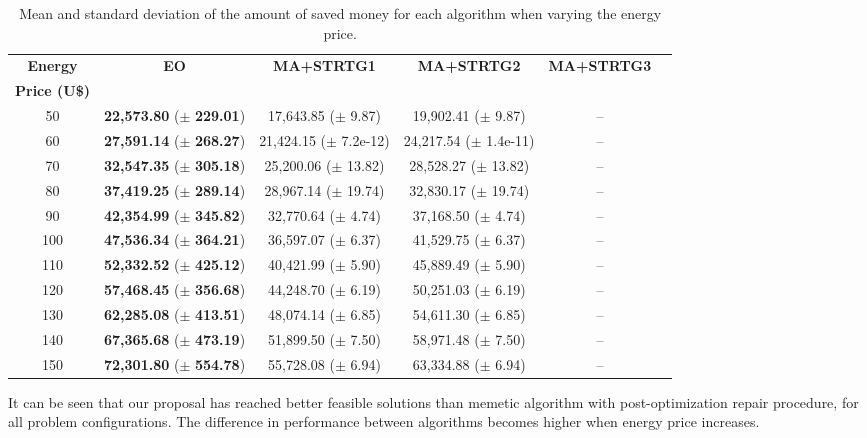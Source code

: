 \documentclass[11pt]{article}
\begin{document}
\begin{table*}[!htb]
\caption{Mean and standard deviation of the amount of saved money for each algorithm 
when varying the energy price.}
\label{tab:results}
\centering
\footnotesize
\begin{tabular}{cccccc}\toprule
  {\bf  Energy}  & \multirow{2}{*}{\bf EO} & \multirow{2}{*}{\bf MA+STRTG1} & \multirow{2}{*}{\bf MA+STRTG2} & \multirow{2}{*}{\bf MA+STRTG3} \\
   {\bf Price (U\$)} &  &  & \\ 
   \toprule  
   50  & {\bf 22,573.80} ($\pm$ {\bf 229.01}) & 17,643.85 ($\pm$ 9.87)    & 19,902.41 ($\pm$ 9.87)  & --  \\ 
  60  & {\bf 27,591.14} ($\pm$ {\bf 268.27}) & 21,424.15 ($\pm$ 7.2e-12) & 24,217.54 ($\pm$ 1.4e-11) & -- \\ 
  70  & {\bf 32,547.35} ($\pm$ {\bf 305.18}) & 25,200.06 ($\pm$ 13.82)   & 28,528.27 ($\pm$ 13.82)   & -- \\ 
  80  & {\bf 37,419.25} ($\pm$ {\bf 289.14}) & 28,967.14 ($\pm$ 19.74)   & 32,830.17 ($\pm$ 19.74)   & -- \\ 
  90  & {\bf 42,354.99} ($\pm$ {\bf 345.82}) & 32,770.64 ($\pm$ 4.74) & 37,168.50 ($\pm$ 4.74) & -- \\ 
 100  & {\bf 47,536.34} ($\pm$ {\bf 364.21}) & 36,597.07 ($\pm$ 6.37) & 41,529.75 ($\pm$ 6.37) & -- \\ 
 110  & {\bf 52,332.52} ($\pm$ {\bf 425.12}) & 40,421.99 ($\pm$ 5.90) & 45,889.49 ($\pm$ 5.90) & -- \\ 
 120  & {\bf 57,468.45} ($\pm$ {\bf 356.68}) & 44,248.70 ($\pm$ 6.19) & 50,251.03 ($\pm$ 6.19) & -- \\ 
 130  & {\bf 62,285.08} ($\pm$ {\bf 413.51}) & 48,074.14 ($\pm$ 6.85) & 54,611.30 ($\pm$ 6.85) & -- \\ 
 140  & {\bf 67,365.68} ($\pm$ {\bf 473.19}) & 51,899.50 ($\pm$ 7.50) & 58,971.48 ($\pm$ 7.50) & -- \\ 
 150  & {\bf 72,301.80} ($\pm$ {\bf 554.78}) & 55,728.08 ($\pm$ 6.94) & 63,334.88 ($\pm$ 6.94) & -- \\ 
  \bottomrule
\end{tabular}
\end{table*}

It can be seen that our proposal has reached better feasible solutions than
memetic algorithm with post-optimization repair procedure, for all problem
configurations. The difference in performance between algorithms becomes higher when
energy price increases. 
\end{document}
